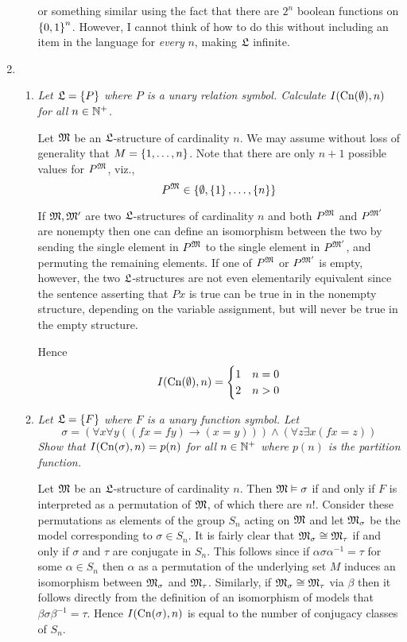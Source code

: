 \documentclass[10pt]{article}
\begin{document}
\begin{enumerate}
\begin{enumerate}
or something similar using the fact that there are $2^n$ boolean functions on $\left\{ 0,1 \right\}^n$.  However, I cannot think of how to do this without including an item in the language for \emph{every} $n$, making $\mathfrak{L}$ infinite.

\end{enumerate}

\item
\begin{enumerate}
\item \emph{Let $\mathfrak{L}=\left\{ P \right\}$ where $P$ is a unary relation symbol.  Calculate $I(\operatorname{Cn}(\emptyset), n)$ for all $n \in \mathbb{N}^+$.}

Let $\mathfrak{M}$ be an $\mathfrak{L}$-structure of cardinality $n$.  We may assume without loss of generality that $M = \left\{ 1,\ldots, n \right\}$.  Note that there are only $n+1$ possible values for $P^{\mathfrak{M}}$, viz., $$P^{\mathfrak{M}} \in \left\{ \emptyset, \left\{ 1 \right\}, \ldots, \left\{ n \right\} \right\}$$

If $\mathfrak{M}, \mathfrak{M}'$ are two $\mathfrak{L}$-structures of cardinality $n$ and both $P^{\mathfrak{M}}$ and $P^{\mathfrak{M}'}$ are nonempty then one can define an isomorphism between the two by sending the single element in $P^{\mathfrak{M}}$ to the single element in $P^{\mathfrak{M}'}$, and permuting the remaining elements.  If one of $P^{\mathfrak{M}}$ or $P^{\mathfrak{M}'}$ is empty, however, the two $\mathfrak{L}$-structures are not even elementarily equivalent since the sentence asserting that $Px$ is true can be true in in the nonempty structure, depending on the variable assignment, but will never be true in the empty structure.

Hence
\[
I(\operatorname{Cn}(\emptyset), n) = \begin{cases} 1 & n = 0 \\ 2 & n > 0\end{cases}
\]
\item \emph{Let $\mathfrak{L} = \left\{ F \right\}$ where $F$ is a unary function symbol.  Let $$\sigma = (\forall x \forall y ((fx = fy) \to (x = y))) \land (\forall z \exists x (fx = z))$$ Show that $I(\operatorname{Cn}(\sigma), n) = p(n)$ for all $n \in \mathbb{N}^+$ where $p(n)$ is the partition function.}

Let $\mathfrak{M}$ be an $\mathfrak{L}$-structure of cardinality $n$.  Then $\mathfrak{M} \vDash \sigma$ if and only if $F$ is interpreted as a permutation of $\mathfrak{M}$, of which there are $n!$.  Consider these permutations as elements of the group $S_n$ acting on $\mathfrak{M}$ and let $\mathfrak{M}_\sigma$ be the model corresponding to $\sigma \in S_n$.  It is fairly clear that $\mathfrak{M}_\sigma \cong \mathfrak{M}_\tau$ if and only if $\sigma$ and $\tau$ are conjugate in $S_n$.  This follows since if $\alpha \sigma \alpha^{-1} = \tau$ for some $\alpha \in S_n$ then $\alpha$ as a permutation of the underlying set $M$ induces an isomorphism between $\mathfrak{M}_\sigma$ and $\mathfrak{M}_\tau$.  Similarly, if $\mathfrak{M}_\sigma \cong \mathfrak{M}_\tau$ via $\beta$ then it follows directly from the definition of an isomorphism of models that $\beta \sigma \beta^{-1} = \tau$.  Hence $I(\operatorname{Cn}(\sigma), n)$ is equal to the number of conjugacy classes of $S_n$.


\end{enumerate}
\end{enumerate}
\end{document}
